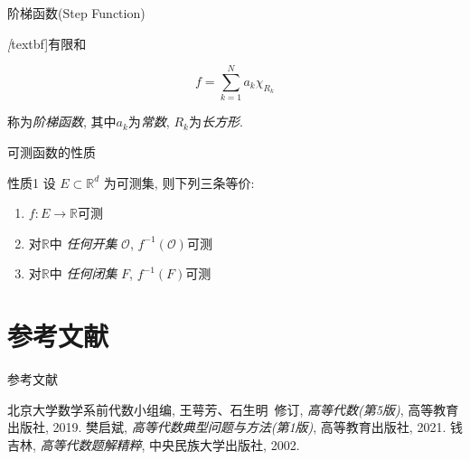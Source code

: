 \documentclass{tingtao-beamer}
\begin{document}
\begin{frame}{阶梯函数(Step Function)}
\begin{definition}
  \emph[textbf]{有限和}
  \begin{emphasize}
    \[f=\sum_{k=1}^Na_k\chi_{R_k}\]
  \end{emphasize}
称为\emph{阶梯函数}, 其中$a_k$为\emph{常数}, $R_k$为\emph{长方形}.
\end{definition}
\end{frame}


\begin{frame}{可测函数的性质}
\begin{block}{性质1}
设 $E\subset\mathbb{R}^d$ 为可测集, 则下列三条等价:
\begin{enumerate}
  \item $f: E\to\mathbb{R}$可测
  \item 对$\mathbb{R}$中 \emph{任何开集} $\mathcal{O}$, $f^{-1}(\mathcal{O})$可测
  \item 对$\mathbb{R}$中 \emph{任何闭集} $F$, $f^{-1}(F)$可测
\end{enumerate}
\end{block}
\end{frame}



\section{参考文献}

\begin{frame}{参考文献}
\begin{thebibliography}{GNN}
  \bibitem{} 北京大学数学系前代数小组编, 王萼芳、石生明\ 修订, \emph{高等代数(第5版)}, 高等教育出版社, 2019.
  \bibitem{} 樊启斌,  \emph{高等代数典型问题与方法(第1版)},  高等教育出版社, 2021.
  \bibitem{} 钱吉林, \emph{高等代数题解精粹},  中央民族大学出版社, 2002.
\end{thebibliography}
\end{frame}
\end{document}
